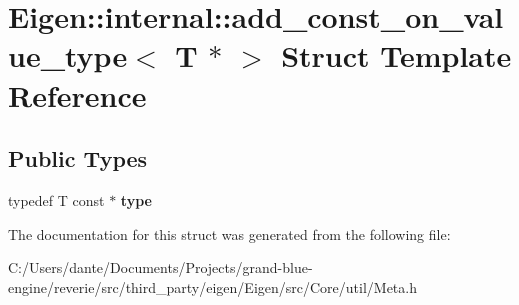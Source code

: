\hypertarget{struct_eigen_1_1internal_1_1add__const__on__value__type_3_01_t_01_5_01_4}{}\section{Eigen\+::internal\+::add\+\_\+const\+\_\+on\+\_\+value\+\_\+type$<$ T $\ast$ $>$ Struct Template Reference}
\label{struct_eigen_1_1internal_1_1add__const__on__value__type_3_01_t_01_5_01_4}
\subsection*{Public Types}
\begin{DoxyCompactItemize}
\item 
\mbox{\label{struct_eigen_1_1internal_1_1add__const__on__value__type_3_01_t_01_5_01_4_a0f7ec490e2155fad880fc9725396de5b}} 
typedef T const  $\ast$ {\bfseries type}
\end{DoxyCompactItemize}


The documentation for this struct was generated from the following file\+:\begin{DoxyCompactItemize}
\item 
C\+:/\+Users/dante/\+Documents/\+Projects/grand-\/blue-\/engine/reverie/src/third\+\_\+party/eigen/\+Eigen/src/\+Core/util/Meta.\+h\end{DoxyCompactItemize}
